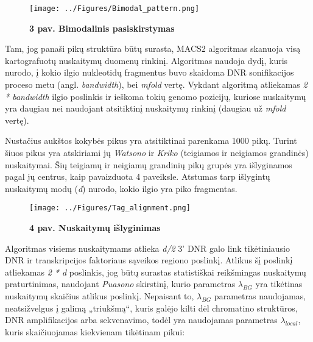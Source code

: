 \documentclass[12pt]{article}
\begin{document}
\begin{figure}[ht]
    \begin{center}
        \texttt{[image: ../Figures/Bimodal\_pattern.png]}
        \vspace{-1\baselineskip}
        \caption*{\small\textbf{3 pav. Bimodalinis pasiskirstymas}}
    \end{center}
\end{figure}

Tam, jog panaši pikų struktūra būtų surasta, MACS2 algoritmas skanuoja visą
kartografuotų nuskaitymų duomenų rinkinį. Algoritmas naudoja dydį, kuris nurodo,
į kokio ilgio nukleotidų fragmentus buvo skaidoma DNR sonifikacijos proceso
metu (angl. \emph{bandwidth}), bei \emph{mfold} vertę. Vykdant algoritmą
atliekamas \emph{2 * bandwidth} ilgio poslinkis ir ieškoma tokių genomo
pozicijų, kuriose nuskaitymų yra daugiau nei naudojant atsitiktinį nuskaitymų
rinkinį (daugiau už \emph{mfold} vertę).

Nustačius aukštos kokybės pikus yra atsitiktinai parenkama 1000 pikų. Turint
šiuos pikus yra atskiriami jų \emph{Watsono} ir \emph{Kriko} (teigiamos ir
neigiamos grandinės) nuskaitymai.
Šių teigiamų ir neigiamų grandinių pikų grupės yra išlyginamos pagal jų
centrus, kaip pavaizduota 4 paveiksle. Atstumas tarp išlygintų nuskaitymų
modų (\emph{d}) nurodo, kokio ilgio yra piko fragmentas.

\begin{figure}[H]
    \begin{center}
        \texttt{[image: ../Figures/Tag\_alignment.png]}
        \caption*{\small\textbf{4 pav. Nuskaitymų išlyginimas}}
        \label{fig:birds}
    \end{center}
\end{figure}

Algoritmas visiems nuskaitymams atlieka \emph{d/2} 3' DNR galo link
tikėtiniausio DNR ir transk\-rip\-ci\-jos faktoriaus sąveikos regiono poslinkį.
Atlikus šį poslinkį atliekamas \emph{2 * d} poslinkis, jog būtų surastas
statistiškai reikšmingas nuskaitymų praturtinimas, naudojant \emph{Puasono}
skirstinį, kurio parametras \(\lambda_{BG}\) yra tikėtinas nuskaitymų skaičius
atlikus poslinkį. Nepaisant to, \(\lambda_{BG}\) parametras naudojamas,
neatsižvelgus į galimą „triukšmą“, kuris galėjo kilti dėl chromatino struktūros,
DNR amplifikacijos arba sekvenavimo, todėl yra naudojamas parametras
\(\lambda_{local}\), kuris skaičiuojamas kiekvienam tikėtinam
pikui:
\end{document}
